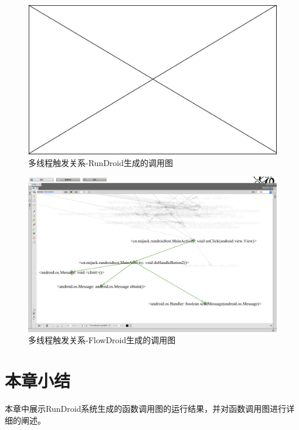 \begin{figure}[ht]
	\centering
	\includegraphics[width=\textwidth]{./Figures/empty.png}
	\caption{多线程触发关系-RunDroid生成的调用图}
	\label{fig:rundroid-result-handler}
\end{figure}

\begin{figure}[ht]
	\centering
	\includegraphics[width=\textwidth]{./Figures/FlowDroid-handler.png}
	\caption{多线程触发关系-FlowDroid生成的调用图}
	\label{fig:flowdroid-result-handler}
\end{figure}
 \section{本章小结}
 
 
本章中展示RunDroid系统生成的函数调用图的运行结果，并对函数调用图进行详细的阐述。
